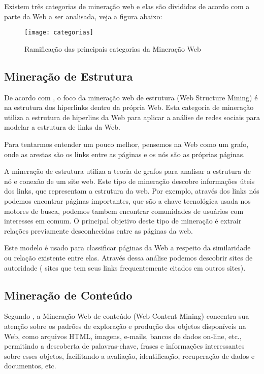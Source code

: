 	Existem três categorias de mineração web e elas são divididas de acordo com a parte da Web a ser analisada, veja a figura abaixo:

\begin{figure}[!htb]
\centering
\texttt{[image: categorias]}
\caption{Ramificação das principais categorias da Mineração Web}
\label{Rotulo}
\end{figure}

\subsection{Mineração de Estrutura}

	De acordo com \cite{Kosala}, o foco da mineração web de estrutura (Web Structure Mining) é na estrutura dos hiperlinks dentro da própria Web. Esta categoria de mineração utiliza a estrutura de hiperlins da Web para aplicar a análise de redes sociais para modelar a estrutura de links da Web.

	Para tentarmos entender um pouco melhor, pensemos na Web como um grafo, onde as arestas são os links entre as páginas e os nós são as próprias páginas.

	A mineração de estrutura utiliza a teoria de grafos para analisar a estrutura de nó e conexão  de um site web. Este tipo de mineração descobre informações úteis dos links, que representam a estrutura da web. Por exemplo, através dos links nós podemos encontrar páginas importantes, que são a chave tecnológica usada nos motores de busca, podemos tambem encontrar comunidades de usuários com interesses em comum. O principal objetivo deste tipo de mineração é extrair relações previamente desconhecidas entre as páginas da web.

	Este modelo é usado para classificar páginas da Web a respeito da similaridade ou relação existente entre elas. Através dessa análise podemos descobrir sites de autoridade ( sites que tem seus links frequentemente citados em outros sites).

\subsection{Mineração de Conteúdo}
    Segundo \cite{Kosala}, a Mineração Web de conteúdo (Web Content Mining) concentra sua atenção sobre os padrões de exploração e produção dos objetos disponíveis na Web, como arquivos HTML, imagens, e-mails, bancos de dados on-line, etc., permitindo a descoberta de palavras-chave, frases e informações interessantes sobre esses objetos, facilitando a avaliação, identificação, recuperação de dados e documentos, etc.


